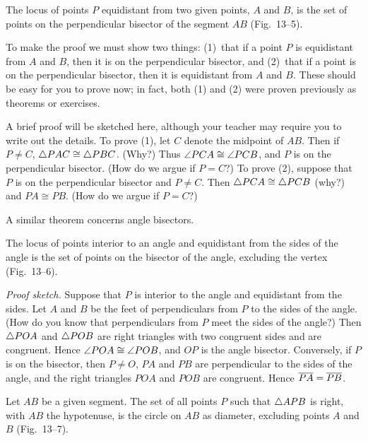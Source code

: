 \documentclass[11pt]{book}
\begin{document}
\FIGXIIIFIVE

\begin{theorem}
The locus of points $P$ equidistant from two given points, $A$ and $B$, is the
set of points on the perpendicular bisector of the segment $AB$ (Fig.~13--5).
\end{theorem}

To make the proof we must show two things: (1)~that if a point $P$ is
equidistant from $A$ and $B$, then it is on the perpendicular bisector, and
(2)~that if a point is on the perpendicular bisector, then it is equidistant
from $A$ and $B$. These should be easy for you to prove now; in fact, both (1)
and (2) were proven previously as theorems or exercises.

A brief proof will be sketched here, although your teacher may require you to
write out the details. To prove (1), let $C$ denote the midpoint of $AB$. Then
if $P \neq C$, $\triangle PAC \cong \triangle PBC$. (Why?) Thus $\angle PCA \cong
\angle PCB$, and $P$ is on the perpendicular bisector. (How do we argue if
$P = C$?) To prove (2), suppose that $P$ is on the perpendicular bisector and
$P \neq C$. Then $\triangle PCA \cong \triangle PCB$ (why?) and $PA \cong PB$. (How do
we argue if $P = C$?)

A similar theorem concerns angle bisectors.

\begin{theorem}
The locus of points interior to an angle and equidistant from the sides of the
angle is the set of points on the bisector of the angle, excluding the vertex
(Fig.~13--6).
\end{theorem}

\FIGXIIISIX

\noindent\emph{Proof sketch.} Suppose that $P$ is interior to the angle and
equidistant from the sides. Let $A$ and $B$ be the feet of perpendiculars from
$P$ to the sides of the angle. (How do you know that perpendiculars from $P$
meet the sides of the angle?) Then $\triangle POA$ and $\triangle POB$ are right
triangles with two congruent sides and are congruent. Hence $\angle POA \cong
\angle POB$, and $OP$ is the angle bisector. Conversely, if $P$ is on the
bisector, then $P \neq O$, $PA$ and $PB$ are perpendicular to the sides of the
angle, and the right triangles $POA$ and $POB$ are congruent. Hence
$\overline{PA} = \overline{PB}$.

\begin{theorem}
Let $AB$ be a given segment. The set of all points $P$ such that $\triangle APB$ is
right, with $AB$ the hypotenuse, is the circle on $AB$ as diameter, excluding
points $A$ and $B$ (Fig.~13--7).
\end{theorem}
\end{document}

